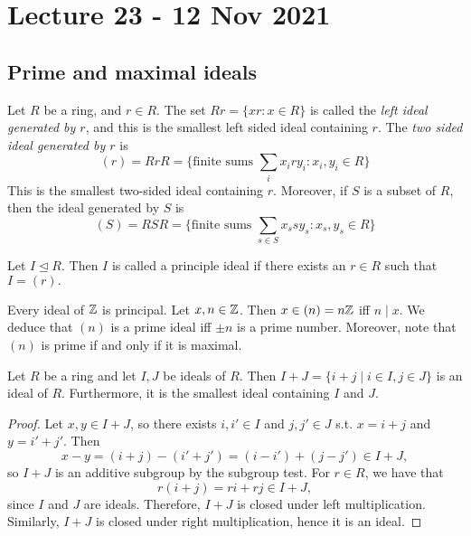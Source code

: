 \section{Lecture 23 - 12 Nov 2021}
\subsection{Prime and maximal ideals}
\begin{definition}
  Let $R$ be a ring, and $r\in R$. The set $Rr=\{xr : x\in R\}$ is called the \emph{left
  ideal generated by $r$}, and this is the smallest left sided ideal containing $r$. The
  \emph{two sided ideal generated by $r$} is
  \[(r)=RrR= \{\text{finite sums }\sum_i x_i r y_i : x_i,y_i\in R\}\]
  This is the smallest two-sided ideal containing $r$. 
   Moreover, if $S$ is a subset of $R$, then
  the ideal generated by $S$ is
  \[(S)=RSR = \{\text{finite sums }\sum_{s\in S} x_s s y_s : x_s,y_s\in R \}\]
\end{definition}

\begin{definition}
     Let $I\unlhd R.$ Then $I$ is called a principle ideal if there exists an $r\in R$ such that $I=(r).$
  
\end{definition}
\begin{example}
  Every ideal of $\mathbb Z$ is principal. Let $x,n\in \mathbb Z$. Then $x\in(n)=n\mathbb Z$ iff $n\mid x$. We
  deduce that $(n)$ is a prime ideal iff $\pm n$ is a prime number. Moreover, note that
  $(n)$ is prime if and only if it is maximal.
\end{example}

\begin{theorem}
  Let $R$ be a ring and let $I,J$ be ideals of $R$. Then $I+J=\{i+j\mid i\in I, j\in J\}$ is
  an ideal of $R$. Furthermore, it is the smallest ideal containing $I$ and $J$.
  \label{<+label+>}
\end{theorem}
\begin{proof}
  Let $x,y\in I+J$, so there exists $i,i'\in I$ and $j,j'\in J$ s.t. $x=i+j$ and $y=i'+j'$. Then $$x-y=(i+j)-(i'+j')=(i-i')+(j-j')\in I+J,$$ so $I+J$ is an additive subgroup by the subgroup test. For $r\in R$, we have that
  $$r(i+j)=ri+rj\in I+J,$$
  since $I$ and $J$ are ideals.
  Therefore, $I+J$ is closed
  under left multiplication. Similarly, $I+J$ is closed under right multiplication, hence it is an ideal.
\end{proof}

